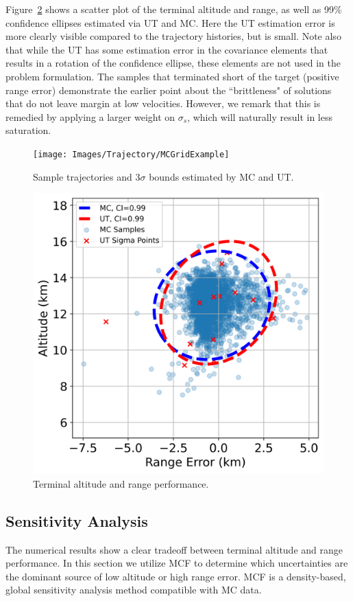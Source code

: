 Figure~\ref{Fig:DetailedScatter} shows a scatter plot of the terminal altitude and range, as well as 99\% confidence ellipses estimated via UT and MC. Here the UT estimation error is more clearly visible compared to the trajectory histories, but is small. Note also that while the UT has some estimation error in the covariance elements that results in a rotation of the confidence ellipse, these elements are not used in the problem formulation. The samples that terminated short of the target (positive range error) demonstrate the earlier point about the ``brittleness" of solutions that do not leave margin at low velocities. However, we remark that this is remedied by applying a larger weight on $\sigma_s$, which will naturally result in less saturation. 
\begin{figure}[h!]
	\centering
	\texttt{[image: Images/Trajectory/MCGridExample]}
	\caption{Sample trajectories and 3$\sigma$ bounds estimated by MC and UT.}
	\label{Fig:DetailedTrajectory}
\end{figure}
\begin{figure}[h!]
	\centering
	\includegraphics[width=1\textwidth]{Images/Trajectory/AltitudeRangeScatterExample}
	\caption{Terminal altitude and range performance.}
	\label{Fig:DetailedScatter}
\end{figure}

\subsection{Sensitivity Analysis}
The numerical results show a clear tradeoff between terminal altitude and range performance. In this section we utilize MCF to determine which uncertainties are the dominant source of low altitude or high range error. MCF is a density-based, global sensitivity analysis method compatible with MC data. 

